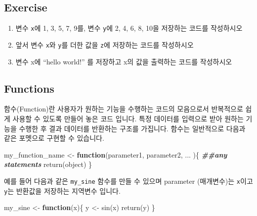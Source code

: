 \documentclass[
]{book}
\newenvironment{Shaded}{\begin{snugshade}}{\end{snugshade}}
\newcommand{\ControlFlowTok}[1]{\textcolor[rgb]{0.13,0.29,0.53}{\textbf{#1}}}
\newcommand{\DocumentationTok}[1]{\textcolor[rgb]{0.56,0.35,0.01}{\textbf{\textit{#1}}}}
\newcommand{\FunctionTok}[1]{\textcolor[rgb]{0.00,0.00,0.00}{#1}}
\newcommand{\NormalTok}[1]{#1}
\newcommand{\OtherTok}[1]{\textcolor[rgb]{0.56,0.35,0.01}{#1}}
\begin{document}
\hypertarget{exercise-2}{%
\subsection{Exercise}\label{exercise-2}}

\begin{enumerate}
\def\labelenumi{\arabic{enumi}.}
\item
  변수 \texttt{x}에 1, 3, 5, 7, 9를, 변수 \texttt{y}에 2, 4, 6, 8, 10을 저장하는 코드를 작성하시오
\item
  앞서 변수 \texttt{x}와 \texttt{y}를 더한 값을 \texttt{z}에 저장하는 코드를 작성하시오
\item
  변수 x에 ``hello world!'' 를 저장하고 x의 값을 출력하는 코드를 작성하시오
\end{enumerate}

\hypertarget{functions}{%
\subsection{Functions}\label{functions}}

함수(Function)란 사용자가 원하는 기능을 수행하는 코드의 모음으로서 반복적으로 쉽게 사용할 수 있도록 만들어 놓은 코드 입니다. 특정 데이터를 입력으로 받아 원하는 기능을 수행한 후 결과 데이터를 반환하는 구조를 가집니다. 함수는 일반적으로 다음과 같은 포멧으로 구현할 수 있습니다.

\begin{Shaded}
\begin{Highlighting}[]
\NormalTok{my\_function\_name }\OtherTok{\textless{}{-}} \ControlFlowTok{function}\NormalTok{(parameter1, parameter2, ... )\{}
  \DocumentationTok{\#\#any statements}
  \FunctionTok{return}\NormalTok{(object)}
\NormalTok{\}}
\end{Highlighting}
\end{Shaded}

예를 들어 다음과 같은 \texttt{my\_sine} 함수를 만들 수 있으며 parameter (매개변수)는 \texttt{x}이고 \texttt{y}는 반환값을 저장하는 지역변수 입니다.

\begin{Shaded}
\begin{Highlighting}[]
\NormalTok{my\_sine }\OtherTok{\textless{}{-}} \ControlFlowTok{function}\NormalTok{(x)\{}
\NormalTok{    y }\OtherTok{\textless{}{-}} \FunctionTok{sin}\NormalTok{(x)}
    \FunctionTok{return}\NormalTok{(y)}
\NormalTok{\}}
\end{Highlighting}
\end{Shaded}
\end{document}
